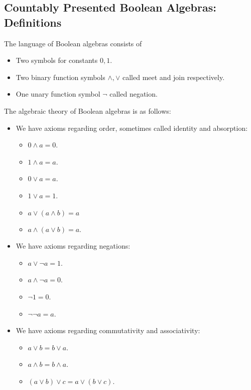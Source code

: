 \subsection{Countably Presented Boolean Algebras: Definitions}
\label{A-cp-boolean-algebras}
\begin{definition}
  The language of Boolean algebras consists of
  \begin{itemize}
    \item Two symbols for constants $0,1$. 
    \item Two binary function symbols $\wedge, \vee$ called meet and join respectively. 
    \item One unary function symbol $\neg$ called negation. 
  \end{itemize}
\end{definition}
\begin{definition}
  The algebraic theory of Boolean algebras is as follows:
  \begin{itemize}
    \item We have axioms regarding order, sometimes called identity and absorption:
    \begin{itemize}
      \item $0 \wedge a = 0$. 
      \item $1 \wedge a = a$. 
      \item $0 \vee a = a$. 
      \item $1 \vee a = 1$. 
      \item $a \vee (a \wedge b) = a$
      \item $a \wedge (a \vee b) = a$. 
    \end{itemize}
    \item We have axioms regarding negations:
      \begin{itemize}
        \item $a \vee \neg a = 1$. 
        \item $a \wedge \neg a = 0$. 
        \item $\neg 1 = 0$. 
        \item $\neg \neg a = a$. 
      \end{itemize}
    \item We have axioms regarding commutativity and associativity:
      \begin{itemize}
        \item $a \vee b = b \vee a$. 
        \item $a \wedge b = b \wedge a$. 
        \item $(a \vee b) \vee c = a \vee (b \vee c)$. 

\end{itemize}
\end{itemize}
\end{definition}
